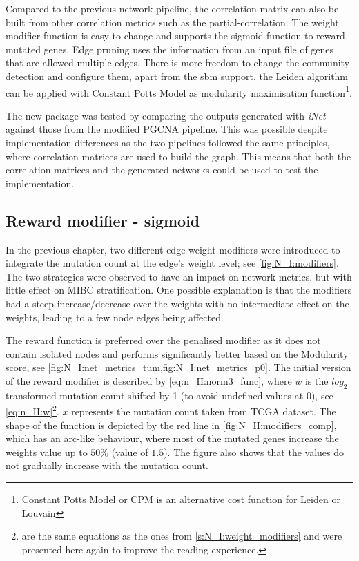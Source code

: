 Compared to the previous network pipeline, the correlation matrix can also be built from other correlation metrics such as the partial-correlation. The weight modifier function is easy to change and supports the sigmoid function to reward mutated genes. Edge pruning uses the information from an input file of genes that are allowed multiple edges. There is more freedom to change the community detection and configure them, apart from the \acrfull{sbm} support, the Leiden algorithm can be applied with Constant Potts Model as modularity maximisation function\footnote{Constant Potts Model or CPM is an alternative cost function for Leiden or Louvain}.

The new package was tested by comparing the outputs generated with \textit{iNet} against those from the modified PGCNA pipeline. This was possible despite implementation differences as the two pipelines followed the same principles, where correlation matrices are used to build the graph. This means that both the correlation matrices and the generated networks could be used to test the implementation.

\subsection*{Reward modifier - sigmoid} \label{s:N_II:reward}

In the previous chapter, two different edge weight modifiers were introduced to integrate the mutation count at the edge's weight level; see \cref{fig:N_I:modifiers}. The two strategies were observed to have an impact on network metrics, but with little effect on MIBC stratification. One possible explanation is that the modifiers had a steep increase/decrease over the weights with no intermediate effect on the weights, leading to a few node edges being affected. 

The reward function is preferred over the penalised modifier as it does not contain isolated nodes and performs significantly better based on the Modularity score, see \cref{fig:N_I:net_metrics_tum,fig:N_I:net_metrics_p0}. The initial version of the reward modifier is described by \cref{eq:n_II:norm3_func}, where $w$ is the $log_2$ transformed mutation count shifted by 1 (to avoid undefined values at 0), see \cref{eq:n_II:w}\footnote{ are the same equations as the ones from \cref{s:N_I:weight_modifiers} and were presented here again to improve the reading experience.}. $x$ represents the mutation count taken from TCGA dataset. The shape of the function is depicted by the red line in \cref{fig:N_II:modifiers_comp}, which has an arc-like behaviour, where most of the mutated genes increase the weights value up to $50\%$ (value of $1.5$). The figure also shows that the values do not gradually increase with the mutation count.

